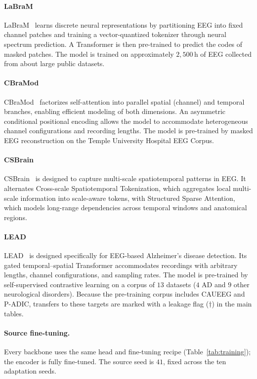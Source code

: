 \documentclass[letterpaper]{article} %
\begin{document}
\paragraph{LaBraM} 
LaBraM~\cite{jiang2024large} learns discrete neural representations by partitioning EEG into fixed channel patches and training a vector-quantized tokenizer through neural spectrum prediction. A Transformer is then pre-trained to predict the codes of masked patches. The model is trained on approximately $2{,}500$\,h of EEG collected from about large public datasets.

\paragraph{CBraMod} 
CBraMod~\cite{wang2025cbramod} factorizes self-attention into parallel spatial (channel) and temporal branches, enabling efficient modeling of both dimensions. An asymmetric conditional positional encoding allows the model to accommodate heterogeneous channel configurations and recording lengths. The model is pre-trained by masked EEG reconstruction on the Temple University Hospital EEG Corpus.

\paragraph{CSBrain}
CSBrain~\cite{zhou2026csbrain} is designed to capture multi-scale spatiotemporal patterns in EEG. It alternates Cross-scale Spatiotemporal Tokenization, which aggregates local multi-scale information into scale-aware tokens, with Structured Sparse Attention, which models long-range dependencies across temporal windows and anatomical regions.

\paragraph{LEAD}
LEAD~\cite{wang2025lead} is designed specifically for EEG-based Alzheimer's disease detection. Its gated temporal--spatial Transformer accommodates recordings with arbitrary lengths, channel configurations, and sampling rates. The model is pre-trained by self-supervised contrastive learning on a corpus of $13$ datasets ($4$ AD and $9$ other neurological disorders). Because the pre-training corpus includes CAUEEG and P-ADIC, transfers to these targets are marked with a leakage flag ($\dagger$) in the main tables.


\paragraph{Source fine-tuning.} Every backbone uses the same head\cite{lee2026test} and fine-tuning recipe (Table~\ref{tab:training}); the encoder is fully fine-tuned. The source seed is $41$, fixed across the ten adaptation seeds.
\end{document}
